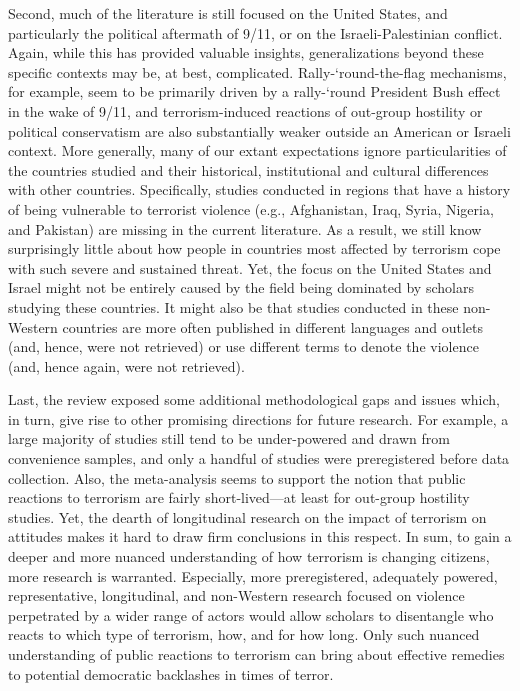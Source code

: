 Second, much of the literature is still focused on the United States, and particularly the political aftermath of 9/11, or on the Israeli-Palestinian conflict. Again, while this has provided valuable insights, generalizations beyond these specific contexts may be, at best, complicated. Rally-‘round-the-flag mechanisms, for example, seem to be primarily driven by a rally-‘round President Bush effect in the wake of 9/11, and terrorism-induced reactions of out-group hostility or political conservatism are also substantially weaker outside an American or Israeli context. More generally, many of our extant expectations ignore particularities of the countries studied and their historical, institutional and cultural differences with other countries. Specifically, studies conducted in regions that have a history of being vulnerable to terrorist violence (e.g., Afghanistan, Iraq, Syria, Nigeria, and Pakistan) are missing in the current literature. As a result, we still know surprisingly little about how people in countries most affected by terrorism cope with such severe and sustained threat. Yet, the focus on the United States and Israel might not be entirely caused by the field being dominated by scholars studying these countries. It might also be that studies conducted in these non-Western countries are more often published in different languages and outlets (and, hence, were not retrieved) or use different terms to denote the violence (and, hence again, were not retrieved).

Last, the review exposed some additional methodological gaps and issues which, in turn, give rise to other promising directions for future research. For example, a large majority of studies still tend to be under-powered and drawn from convenience samples, and only a handful of studies were preregistered before data collection. Also, the meta-analysis seems to support the notion that public reactions to terrorism are fairly short-lived—at least for out-group hostility studies. Yet, the dearth of longitudinal research on the impact of terrorism on attitudes makes it hard to draw firm conclusions in this respect. In sum, to gain a deeper and more nuanced understanding of how terrorism is changing citizens, more research is warranted. Especially, more preregistered, adequately powered, representative, longitudinal, and non-Western research focused on violence perpetrated by a wider range of actors would allow scholars to disentangle who reacts to which type of terrorism, how, and for how long. Only such nuanced understanding of public reactions to terrorism can bring about effective remedies to potential democratic backlashes in times of terror.



